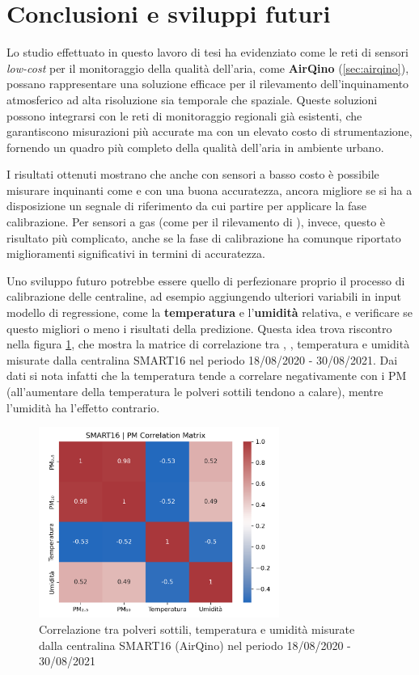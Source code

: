 \chapter*{Conclusioni e sviluppi futuri}\label{ch:conclusioni}
Lo studio effettuato in questo lavoro di tesi ha evidenziato come le reti di sensori \textit{low-cost} per il monitoraggio della qualità dell'aria, come \textbf{AirQino} (\ref{sec:airqino}), possano rappresentare una soluzione efficace per il rilevamento dell'inquinamento atmosferico ad alta risoluzione sia temporale che spaziale. Queste soluzioni possono integrarsi con le reti di monitoraggio regionali già esistenti, che garantiscono misurazioni più accurate ma con un elevato costo di strumentazione, fornendo un quadro più completo della qualità dell'aria in ambiente urbano.

I risultati ottenuti mostrano che anche con sensori a basso costo è possibile misurare inquinanti come  e  con una buona accuratezza, ancora migliore se si ha a disposizione un segnale di riferimento da cui partire per applicare la fase calibrazione. Per sensori a gas (come per il rilevamento di ), invece, questo è risultato più complicato, anche se la fase di calibrazione ha comunque riportato miglioramenti significativi in termini di accuratezza.

Uno sviluppo futuro potrebbe essere quello di perfezionare proprio il processo di calibrazione delle centraline, ad esempio aggiungendo ulteriori variabili in input modello di regressione, come la \textbf{temperatura} e l'\textbf{umidità} relativa, e verificare se questo migliori o meno i risultati della predizione.
 Questa idea trova riscontro nella figura \ref{fig:corr}, che mostra la matrice di correlazione tra , , temperatura e umidità misurate dalla centralina SMART16 nel periodo 18/08/2020 - 30/08/2021. Dai dati si nota infatti che la temperatura tende a correlare negativamente con i PM (all'aumentare della temperatura  le polveri sottili tendono a calare), mentre l'umidità ha l'effetto contrario.
		
\begin{figure}[H]
\centering
\captionsetup{justification=centering}
\includegraphics[width=0.70\textwidth,height=\textheight,keepaspectratio]{img/corr}
\caption{Correlazione tra polveri sottili, temperatura e umidità misurate dalla centralina SMART16 (AirQino) nel periodo 18/08/2020 - 30/08/2021}
\label{fig:corr}
\end{figure}

